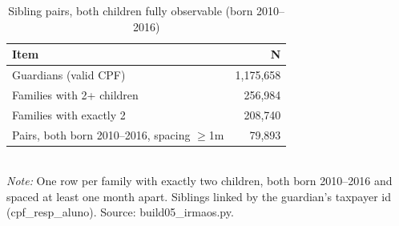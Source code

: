 \begin{table}[htbp]\centering
\caption{Sibling pairs, both children fully observable (born 2010--2016)}
\label{tab:S1c_pares}
\small
\begin{tabular}{lr}
\toprule
Item & N \\
\midrule
Guardians (valid CPF) & 1,175,658 \\
Families with 2+ children & 256,984 \\
Families with exactly 2 & 208,740 \\
Pairs, both born 2010--2016, spacing $\geq$1m & 79,893 \\
\bottomrule
\end{tabular}
\\[3pt]{\footnotesize \textit{Note:} One row per family with exactly two children, both born 2010--2016 and spaced at least one month apart. Siblings linked by the guardian's taxpayer id (cpf\_resp\_aluno). Source: build05\_irmaos.py.}
\end{table}
